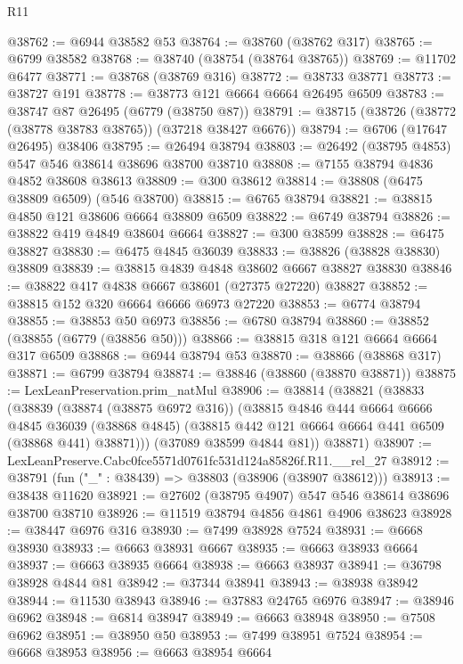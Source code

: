 \begin{lexlean}{R11}
\begin{coremodule}
@38762 := @6944 @38582 @53
@38764 := @38760 (@38762 @317)
@38765 := @6799 @38582
@38768 := @38740 (@38754 (@38764 @38765))
@38769 := @11702 @6477
@38771 := @38768 (@38769 @316)
@38772 := @38733 @38771
@38773 := @38727 @191
@38778 := @38773 @121 @6664 @6664 @26495 @6509
@38783 := @38747 @87 @26495 (@6779 (@38750 @87))
@38791 := @38715 (@38726 (@38772 (@38778 @38783 @38765)) (@37218 @38427 @6676))
@38794 := @6706 (@17647 @26495) @38406
@38795 := @26494 @38794
@38803 := @26492 (@38795 @4853) @547 @546 @38614 @38696 @38700 @38710
@38808 := @7155 @38794 @4836 @4852 @38608 @38613
@38809 := @300 @38612
@38814 := @38808 (@6475 @38809 @6509) (@546 @38700)
@38815 := @6765 @38794
@38821 := @38815 @4850 @121 @38606 @6664 @38809 @6509
@38822 := @6749 @38794
@38826 := @38822 @419 @4849 @38604 @6664
@38827 := @300 @38599
@38828 := @6475 @38827
@38830 := @6475 @4845 @36039
@38833 := @38826 (@38828 @38830) @38809
@38839 := @38815 @4839 @4848 @38602 @6667 @38827 @38830
@38846 := @38822 @417 @4838 @6667 @38601 (@27375 @27220) @38827
@38852 := @38815 @152 @320 @6664 @6666 @6973 @27220
@38853 := @6774 @38794
@38855 := @38853 @50 @6973
@38856 := @6780 @38794
@38860 := @38852 (@38855 (@6779 (@38856 @50)))
@38866 := @38815 @318 @121 @6664 @6664 @317 @6509
@38868 := @6944 @38794 @53
@38870 := @38866 (@38868 @317)
@38871 := @6799 @38794
@38874 := @38846 (@38860 (@38870 @38871))
@38875 := LexLeanPreservation.prim_natMul
@38906 := @38814
    (@38821
      (@38833
        (@38839
          (@38874 (@38875 @6972 @316))
          (@38815
            @4846
            @444
            @6664
            @6666
            @4845
            @36039
            (@38868 @4845)
            (@38815 @442 @121 @6664 @6664 @441 @6509 (@38868 @441) @38871)))
        (@37089 @38599 @4844 @81))
      @38871)
@38907 := LexLeanPreserve.Cabc0fce5571d0761fc531d124a85826f.R11.__rel_27
@38912 := @38791 (fun ("_" : @38439) => @38803 (@38906 (@38907 @38612)))
@38913 := @38438 @11620
@38921 := @27602 (@38795 @4907) @547 @546 @38614 @38696 @38700 @38710
@38926 := @11519 @38794 @4856 @4861 @4906 @38623
@38928 := @38447 @6976 @316
@38930 := @7499 @38928 @7524
@38931 := @6668 @38930
@38933 := @6663 @38931 @6667
@38935 := @6663 @38933 @6664
@38937 := @6663 @38935 @6664
@38938 := @6663 @38937
@38941 := @36798 @38928 @4844 @81
@38942 := @37344 @38941
@38943 := @38938 @38942
@38944 := @11530 @38943
@38946 := @37883 @24765 @6976
@38947 := @38946 @6962
@38948 := @6814 @38947
@38949 := @6663 @38948
@38950 := @7508 @6962
@38951 := @38950 @50
@38953 := @7499 @38951 @7524
@38954 := @6668 @38953
@38956 := @6663 @38954 @6664

\end{coremodule}
\end{lexlean}
